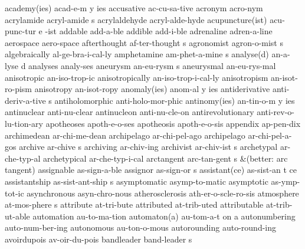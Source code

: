 \begingroup
\eightpoint
\3 academy(ies)		acad-e-m y ies
\1 accusative		ac-cu-sa-tive		%
\1 acronym		acro-nym		%
\5 acrylamide		acryl-amide s		%
\1 acrylaldehyde	acryl-alde-hyde		%
\NewWordtrue
\3 acupuncture(ist)	acu-punc-tur e -ist	%
\1 addable		add-a-ble
\1 addible		add-i-ble
\1 adrenaline		adren-a-line
\1 aerospace		aero-space
\5 afterthought 	af-ter-thought s
\5 agronomist		agron-o-mist s
\1 algebraically	al-ge-bra-i-cal-ly	%
\5 amphetamine		am-phet-a-mine s
\2 analyse(d)		an-a-lyse d
\1 analyses		analy-ses\thinspace*
\NewWordtrue
\5 aneurysm		an-eu-rysm s		%
\NewWordtrue
\1 aneurysmal		an-eu-rys-mal		%
\1 anisotropic		an-iso-trop-ic		%
\1 anisotropically	an-iso-trop-i-cal-ly	%
\1 anisotropism		an-isot-ro-pism 	%
\1 anisotropy		an-isot-ropy		%
\3 anomaly(ies)		anom-al y ies
\5 antiderivative	anti-deriv-a-tive s
\1 antiholomorphic	anti-holo-mor-phic	%
\3 antinomy(ies)	an-tin-o-m y ies
\1 antinuclear		anti-nu-clear
\1 antinucleon		anti-nu-cle-on
\1 antirevolutionary	anti-rev-o-lu-tion-ary
\1 apotheoses		apoth-e-o-ses
\1 apotheosis		apoth-e-o-sis
\1 appendix		ap-pen-dix
\1 archimedean		ar-chi-me-dean		%
\1 archipelago		ar-chi-pel-ago       %
\1 archipelago		ar-chi-pel-a-gos
\5 archive		ar-chive s              %
\1 archiving		ar-chiv-ing             %
\5 archivist		ar-chiv-ist s           %
\1 archetypal		ar-che-typ-al
\1 archetypical		ar-che-typ-i-cal
\5 arctangent		arc-tan-gent s
\tabalign		&\null\quad (better: arc\,tangent)\cr
\1 assignable		as-sign-a-ble
\5 assignor		as-sign-or s
\3 assistant(ce)	as-sist-an t ce		%
\5 assistantship	as-sist-ant-ship s
\1 asymptomatic		asymp-to-matic
\1 asymptotic		as-ymp-tot-ic
\1 asynchronous		asyn-chro-nous
\1 atherosclerosis	ath-er-o-scle-ro-sis
\5 atmosphere		at-mos-phere s
\1 attribute		at-tri-bute		%
\1 attributed		at-trib-uted
\1 attributable		at-trib-ut-able
\1 automation		au-to-ma-tion           %
\3 automaton(a)		au-tom-a-t on a         %
\1 autonumbering	auto-num-ber-ing	%
\1 autonomous		au-ton-o-mous		%
\1 autorounding		auto-round-ing		%
\1 avoirdupois		av-oir-du-pois
\5 bandleader		band-leader s
